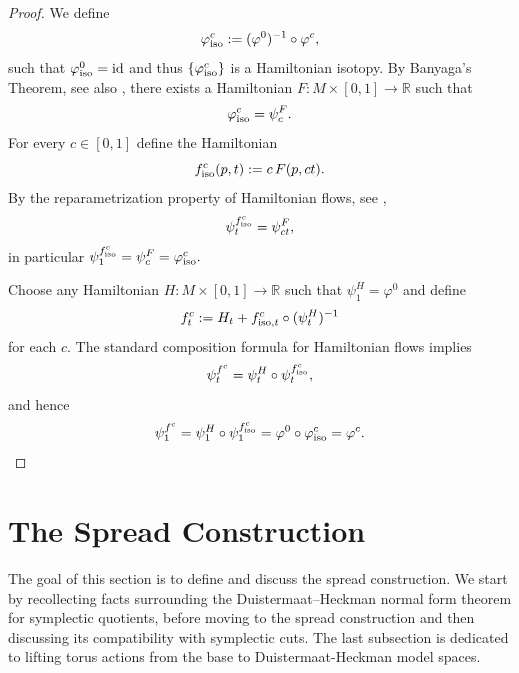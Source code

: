 \documentclass[10pt,oneside,reqno]{amsart}
\theoremstyle{definition}
\newcommand{\id}{\textup{id}}
\newcommand{\iso}{\textup{iso}}
\begin{document}
\begin{proof}
We define
\begin{equation*}
\varphi_\iso^c := (\varphi^0)^{-1}\circ \varphi^c,
\end{equation*}
such that $\varphi_\iso^0=\id$ and thus $\{\varphi_\iso^c\}$ is a Hamiltonian isotopy.
By Banyaga's Theorem, see also \cite[Proposition 1.4.B]{polterovich2012geometry}, there exists a Hamiltonian
$F:M\times[0,1]\to\mathbb{R}$ such that
\begin{equation*}
\varphi_\iso^c = \psi^F_c .
\end{equation*}
For every $c\in[0,1]$ define the Hamiltonian
\begin{equation*}
f_\iso^c(p,t) := c\,F(p,ct).
\end{equation*}
By the reparametrization property of Hamiltonian flows, see \cite[Exercise 1.4.A]{polterovich2012geometry}, $$\psi^{f_\iso^c}_t = \psi^F_{ct},$$ in particular
$
\psi^{f_\iso^c}_1 = \psi^F_c = \varphi_\iso^c.
$

Choose any Hamiltonian $H:M\times[0,1]\to\mathbb{R}$ such that
$\psi^H_1=\varphi^0$ and define
\begin{equation*}
f^c_t := H_t + f_{\iso,t}^c \circ (\psi^H_t)^{-1}
\end{equation*}
for each $c$. The standard composition formula for Hamiltonian flows implies
\begin{equation*}
\psi^{f^c}_t = \psi^H_t \circ \psi^{f_\iso^c}_t,
\end{equation*}
and hence
\begin{equation*}
\psi^{f^c}_1
= \psi^H_1 \circ \psi^{f_\iso^c}_1
= \varphi^0 \circ \varphi_\iso^c
= \varphi^c. \qedhere
\end{equation*}
\end{proof}



\section{The Spread Construction} \label{sec:spreadconstruction} 
The goal of this section is to define and discuss the spread construction. We start by recollecting facts surrounding the Duistermaat--Heckman normal form theorem for symplectic quotients, before moving to the spread construction and then discussing its compatibility with symplectic cuts. The last subsection is dedicated to lifting torus actions from the base to Duistermaat-Heckman model spaces.
\end{document}
